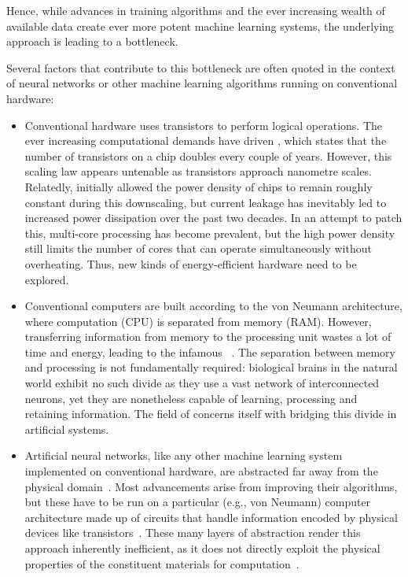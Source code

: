 Hence, while advances in training algorithms and the ever increasing wealth of available data create ever more potent machine learning systems, the underlying approach is leading to a bottleneck. \par
Several factors that contribute to this bottleneck are often quoted in the context of neural networks or other machine learning algorithms running on conventional hardware:
\begin{itemize} %
	\item Conventional hardware uses transistors to perform logical operations.
	The ever increasing computational demands have driven , which states that the number of transistors on a chip doubles every couple of years.
	However, this scaling law appears untenable as transistors approach nanometre scales.
	Relatedly,  initially allowed the power density of chips to remain roughly constant during this downscaling, but current leakage has inevitably led to increased power dissipation over the past two decades.
	In an attempt to patch this, multi-core processing has become prevalent, but the high power density still limits the number of cores that can operate simultaneously without overheating. %
	Thus, new kinds of energy-efficient hardware need to be explored.
	\item Conventional computers are built according to the von Neumann architecture, where computation (CPU) is separated from memory (RAM).
	However, transferring information from memory to the processing unit wastes a lot of time and energy, leading to the infamous ~\cite{TaskAdaptivePRC}.
	The separation between memory and processing is not fundamentally required: biological brains in the natural world exhibit no such divide as they use a vast network of interconnected neurons, yet they are nonetheless capable of learning, processing and retaining information.
	The field of  concerns itself with bridging this divide in artificial systems.
	\item Artificial neural networks, like any other machine learning system implemented on conventional hardware, are abstracted far away from the physical domain~\cite{RC_ASI}.
	Most advancements arise from improving their algorithms, but these have to be run on a particular (e.g., von Neumann) computer architecture made up of circuits that handle information encoded by physical devices like transistors~\cite{RC_SuperconductingElectronics}.
	These many layers of abstraction render this approach inherently inefficient, as it does not directly exploit the physical properties of the constituent materials for computation~\cite{RC_ASI}.
\end{itemize}
